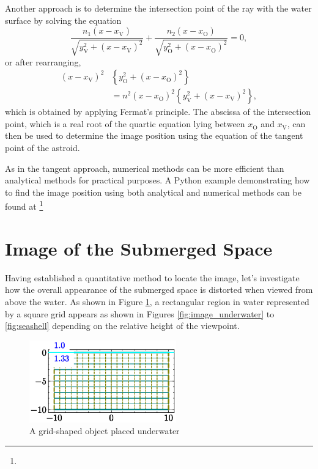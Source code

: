 \documentclass[twocolumn]{article}
\begin{document}
Another approach is to determine the intersection point of the ray with the water surface by solving the equation
\[
\dfrac{n_1 \left( x - x_{\mathrm{V}}^{} \right)}{\sqrt{ y_{\mathrm{V}}^2 + \left( x - x_{\mathrm{V}}^{} \right)^2 }}
+\dfrac{n_2 \left( x - x_{\mathrm{O}}^{} \right)}{\sqrt{ y_{\mathrm{O}}^2 + \left( x - x_{\mathrm{O}}^{} \right)^2 }}
= 0,
\]
or after rearranging,
\[ \begin{aligned}
	\left( x - x_{\mathrm{V}}^{} \right)^2 &\left\{ y_{\mathrm{O}}^2 + \left(x - x_{\mathrm{O}}^{} \right)^2 \right\} \\
	&= n^2 \left( x - x_{\mathrm{O}}^{} \right)^2 \left\{ y_{\mathrm{V}}^2 + \left(x - x_{\mathrm{V}}^{} \right)^2 \right\},
\end{aligned}
\]
which is obtained by applying Fermat's principle. The abscissa of the intersection point, which is a real root of the quartic equation
lying between $x_{\mathrm{O}}^{}$ and $x_{\mathrm{V}}^{}$, can then be used to determine the image position using the equation of the tangent point of the astroid.

As in the tangent approach, numerical methods can be more efficient than analytical methods for practical purposes. A Python example demonstrating how to find the image position using both analytical and numerical methods can be found at 
\href{https://github.com/mingshey/python_projects/blob/main/Refraction_Image.ipynb}%
{}\footnote{}

\section{Image of the Submerged Space}

Having established a quantitative method to locate the image, let's investigate how the overall appearance of the submerged space is distorted when viewed from above the water. As shown in Figure \ref{fig:grid_underwater}, a rectangular region in water represented by a square grid appears as shown in Figures \ref{fig:image_underwater} to \ref{fig:seashell} depending on the relative height of the viewpoint.

\begin{figure}
	\centering
	\includegraphics[width=2.5in]{figs/grid_underwater.eps}
	\caption{A grid-shaped object placed underwater}
	\label{fig:grid_underwater}
\end{figure}
\end{document}
